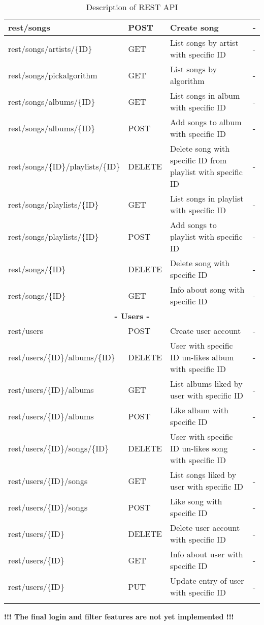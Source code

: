 \begin{longtable}{|p{}|p{}|p{}|p{}|}
        rest/songs & POST & Create song & - \\\hline
        rest/songs/artists/\{ID\} & GET & List songs by artist with specific ID & - \\\hline
        rest/songs/pickalgorithm & GET & List songs by algorithm & - \\\hline
        rest/songs/albums/\{ID\} & GET & List songs in album with specific ID & - \\\hline
        rest/songs/albums/\{ID\} & POST & Add songs to album with specific ID & - \\\hline
        rest/songs/\{ID\}/playlists/\{ID\} & DELETE & Delete song with specific ID from playlist with specific ID & - \\\hline
        rest/songs/playlists/\{ID\} & GET & List songs in playlist with specific ID & - \\\hline
        rest/songs/playlists/\{ID\} & POST & Add songs to playlist with specific ID & - \\\hline
        rest/songs/\{ID\} & DELETE & Delete song with specific ID & - \\\hline
        rest/songs/\{ID\} & GET & Info about song with specific ID & - \\\hline
        \multicolumn{4}{|c|}{\textbf{- Users -}} \\\hline
        rest/users & POST & Create user account & - \\\hline
        rest/users/\{ID\}/albums/\{ID\} & DELETE & User with specific ID un-likes album with specific ID & - \\\hline
        rest/users/\{ID\}/albums & GET & List albums liked by user with specific ID & - \\\hline
        rest/users/\{ID\}/albums & POST & Like album with specific ID & - \\\hline
        rest/users/\{ID\}/songs/\{ID\} & DELETE & User with specific ID un-likes song with specific ID & - \\\hline
        rest/users/\{ID\}/songs & GET & List songs liked by user with specific ID & - \\\hline
        rest/users/\{ID\}/songs & POST & Like song with specific ID & - \\\hline
        rest/users/\{ID\} & DELETE & Delete user account with specific ID & - \\\hline
        rest/users/\{ID\} & GET & Info about user with specific ID & - \\\hline
        rest/users/\{ID\} & PUT & Update entry of user with specific ID & - \\\hline
        \hline
\caption{Description of  REST API}
\label{tab:termGlossary}
\end{longtable}
\textbf{!!! The final login and filter features are not yet implemented !!!}
